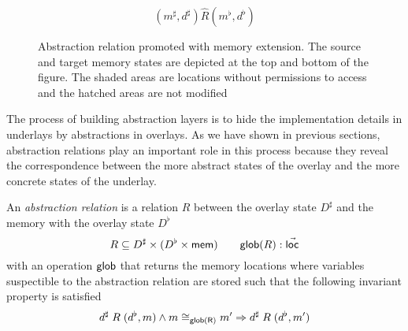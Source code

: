 \documentclass[acmsmall,review,anonymous]{acmart}\settopmatter{printfolios=true,printccs=false,printacmref=false}
\begin{document}
\begin{figure} %
  \[ (m^\sharp, d^\sharp) \mathrel{\hat{R}} (m^\flat, d^\flat) \]
  \caption{Abstraction relation promoted with memory extension.
    The source and target memory states are depicted at the top
    and bottom of the figure. The shaded areas are locations
    without permissions to access and the hatched areas are not
    modified}
  \label{fig:abrel}
\end{figure}

The process of building abstraction layers
is to hide the implementation details in underlays
by abstractions in overlays.
As we have shown in previous sections,
abstraction relations play an important role
in this process
because they reveal
the correspondence between
the more abstract states of the overlay
and the more concrete states of the underlay.

\begin{definition}
  An \emph{abstraction relation} is a relation $R$
  between the overlay state $D^\sharp$
  and the memory with the overlay state $D^\flat$
  \[
    R \subseteq D^\sharp \times (D^\flat \times  \mathsf{mem} )
    \qquad
     \mathsf{glob} (R): \vec{ \mathsf{loc} }
  \]
  with an operation $ \mathsf{glob} $ that returns
  the memory locations
  where variables suspectible to the abstraction relation
  are stored
  such that the following invariant property is satisfied
  \[
    d^\sharp \mathrel{R} (d^\flat, m) \wedge
    m \cong_{ \mathsf{glob(R)} } m' \Rightarrow
    d^\sharp \mathrel{R} (d^\flat, m')
  \]
\end{definition}
\end{document}
